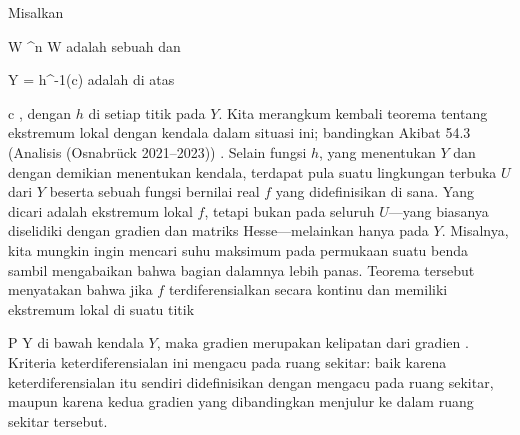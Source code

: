 {}
{

Misalkan

\mavergleichskette
{\vergleichskette
{ W
}
{ \subseteq }{ \R^n
}
{  }{
}
{    }{
}
{   }{
}
}
{}{}{}
 { W } { \R
} {}
adalah sebuah
dan

\mavergleichskette
{\vergleichskette
{ Y
}
{ = }{ h^{-1}(c)
}
{  }{
}
{    }{
}
{   }{
}
}
{}{}{}
adalah
di atas

\mavergleichskette
{\vergleichskette
{ c
}
{ \in }{ \R
}
{  }{
}
{    }{
}
{   }{
}
}
{}{}{,}
dengan $h$
di setiap titik pada $Y$. Kita merangkum kembali teorema tentang ekstremum lokal dengan kendala dalam situasi ini; bandingkan
Akibat 54.3 (Analisis (Osnabrück 2021--2023))
 {} {.}
Selain fungsi $h$, yang menentukan $Y$ dan dengan demikian menentukan kendala, terdapat pula suatu lingkungan terbuka $U$ dari $Y$ beserta sebuah fungsi bernilai real $f$ yang didefinisikan di sana. Yang dicari adalah ekstremum lokal $f$, tetapi bukan pada seluruh $U$---yang biasanya diselidiki dengan gradien dan matriks Hesse---melainkan hanya pada $Y$. Misalnya, kita mungkin ingin mencari suhu maksimum pada permukaan suatu benda sambil mengabaikan bahwa bagian dalamnya lebih panas. Teorema tersebut menyatakan bahwa jika $f$ terdiferensialkan secara kontinu dan memiliki ekstremum lokal di suatu titik

\mavergleichskette
{\vergleichskette
{ P
}
{ \in }{ Y
}
{  }{
}
{    }{
}
{   }{
}
}
{}{}{}
di bawah kendala $Y$, maka gradien
 merupakan kelipatan dari gradien
. Kriteria keterdiferensialan ini mengacu pada ruang sekitar: baik karena keterdiferensialan itu sendiri didefinisikan dengan mengacu pada ruang sekitar, maupun karena kedua gradien yang dibandingkan menjulur ke dalam ruang sekitar tersebut.

}



